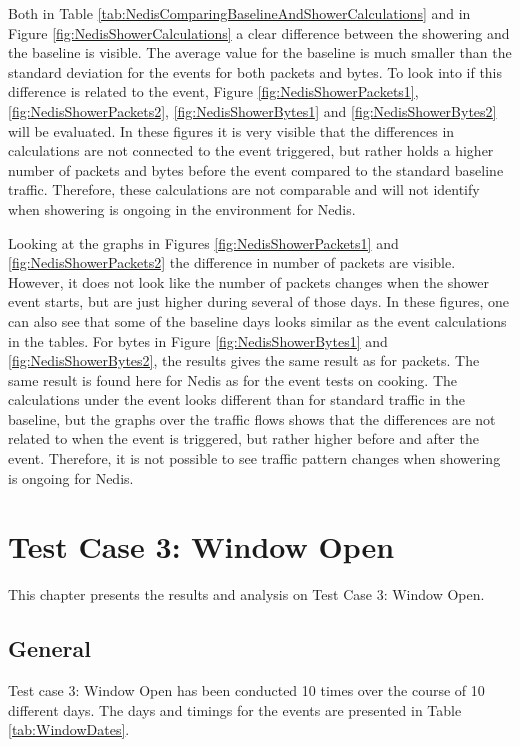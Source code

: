 Both in Table \ref{tab:NedisComparingBaselineAndShowerCalculations} and in Figure \ref{fig:NedisShowerCalculations} a clear difference between the showering and the baseline is visible. The average value for the baseline is much smaller than the standard deviation for the events for both packets and bytes. To look into if this difference is related to the event, Figure \ref{fig:NedisShowerPackets1}, \ref{fig:NedisShowerPackets2}, \ref{fig:NedisShowerBytes1} and \ref{fig:NedisShowerBytes2} will be evaluated. In these figures it is very visible that the differences in calculations are not connected to the event triggered, but rather holds a higher number of packets and bytes before the event compared to the standard baseline traffic. Therefore, these calculations are not comparable and will not identify when showering is ongoing in the environment for Nedis.

Looking at the graphs in Figures \ref{fig:NedisShowerPackets1} and \ref{fig:NedisShowerPackets2} the difference in number of packets are visible. However, it does not look like the number of packets changes when the shower event starts, but are just higher during several of those days. In these figures, one can also see that some of the baseline days looks similar as the event calculations in the tables. For bytes in Figure \ref{fig:NedisShowerBytes1} and \ref{fig:NedisShowerBytes2}, the results gives the same result as for packets. The same result is found here for Nedis as for the event tests on cooking. The calculations under the event looks different than for standard traffic in the baseline, but the graphs over the traffic flows shows that the differences are not related to when the event is triggered, but rather higher before and after the event. Therefore, it is not possible to see traffic pattern changes when showering is ongoing for Nedis. 

\newpage
\section{Test Case 3: Window Open}
This chapter presents the results and analysis on Test Case 3: Window Open. 
\subsection{General}
Test case 3: Window Open has been conducted 10 times over the course of 10 different days. The days and timings for the events are presented in Table \ref{tab:WindowDates}.

